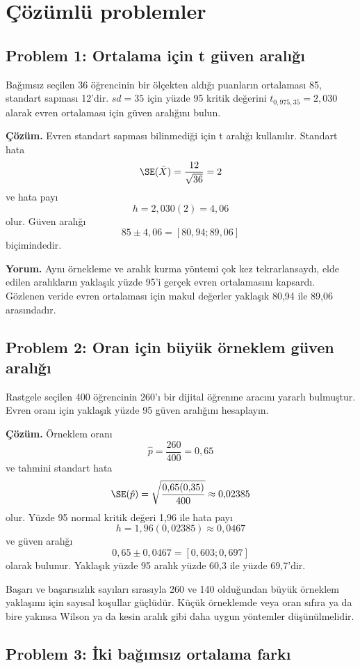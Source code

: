 \section{Çözümlü problemler}

\subsection*{Problem 1: Ortalama için t güven aralığı}

Bağımsız seçilen 36 öğrencinin bir ölçekten aldığı puanların ortalaması 85,
standart sapması 12'dir. $sd=35$ için yüzde 95 kritik değerini
$t_{0{,}975,35}=2{,}030$ alarak evren ortalaması için güven aralığını bulun.

\textbf{Çözüm.} Evren standart sapması bilinmediği için t aralığı kullanılır.
Standart hata
\[
\SE(\bar X)=\frac{12}{\sqrt{36}}=2
\]
ve hata payı
\[
h=2{,}030(2)=4{,}06
\]
olur. Güven aralığı
\[
85\pm4{,}06=[80{,}94;89{,}06]
\]
biçimindedir.

\textbf{Yorum.} Aynı örnekleme ve aralık kurma yöntemi çok kez
tekrarlansaydı, elde edilen aralıkların yaklaşık yüzde 95'i gerçek evren
ortalamasını kapsardı. Gözlenen veride evren ortalaması için makul değerler
yaklaşık 80,94 ile 89,06 arasındadır.

\subsection*{Problem 2: Oran için büyük örneklem güven aralığı}

Rastgele seçilen 400 öğrencinin 260'ı bir dijital öğrenme aracını yararlı
bulmuştur. Evren oranı için yaklaşık yüzde 95 güven aralığını hesaplayın.

\textbf{Çözüm.} Örneklem oranı
\[
\hat p=\frac{260}{400}=0{,}65
\]
ve tahmini standart hata
\[
\SE(\hat p)=\sqrt{\frac{0{,}65(0{,}35)}{400}}
\approx0{,}02385
\]
olur. Yüzde 95 normal kritik değeri 1,96 ile hata payı
\[
h=1{,}96(0{,}02385)\approx0{,}0467
\]
ve güven aralığı
\[
0{,}65\pm0{,}0467=[0{,}603;0{,}697]
\]
olarak bulunur. Yaklaşık yüzde 95 aralık yüzde 60,3 ile yüzde 69,7'dir.

Başarı ve başarısızlık sayıları sırasıyla 260 ve 140 olduğundan büyük örneklem
yaklaşımı için sayısal koşullar güçlüdür. Küçük örneklemde veya oran sıfıra ya
da bire yakınsa Wilson ya da kesin aralık gibi daha uygun yöntemler
düşünülmelidir.

\subsection*{Problem 3: İki bağımsız ortalama farkı}

